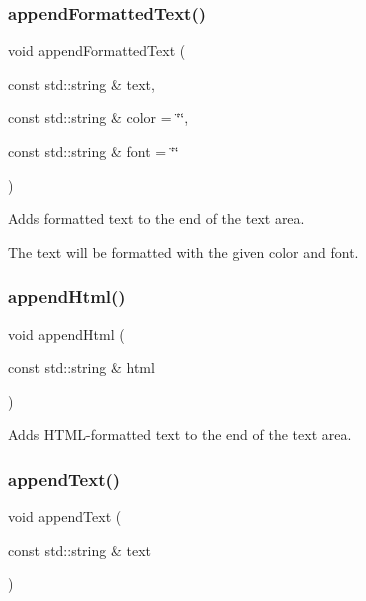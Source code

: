 \subsubsection{\texorpdfstring{append\+Formatted\+Text()}{appendFormattedText()}}
{\footnotesize\ttfamily void append\+Formatted\+Text (\begin{DoxyParamCaption}\item[{const std\+::string \&}]{text,  }\item[{const std\+::string \&}]{color = {\ttfamily \char`\"{}\char`\"{}},  }\item[{const std\+::string \&}]{font = {\ttfamily \char`\"{}\char`\"{}} }\end{DoxyParamCaption})\hspace{0.3cm}{\ttfamily [virtual]}}



Adds formatted text to the end of the text area. 

The text will be formatted with the given color and font. \mbox{\label{classsgl_1_1GTextArea_aa3457253e58dbfbf65a8f5a28c65fb5f}} 
\subsubsection{\texorpdfstring{append\+Html()}{appendHtml()}}
{\footnotesize\ttfamily void append\+Html (\begin{DoxyParamCaption}\item[{const std\+::string \&}]{html }\end{DoxyParamCaption})\hspace{0.3cm}{\ttfamily [virtual]}}



Adds H\+T\+M\+L-\/formatted text to the end of the text area. 

\mbox{\label{classsgl_1_1GTextArea_a6ba815b59563007b60dc2052d4703146}} 
\subsubsection{\texorpdfstring{append\+Text()}{appendText()}}
{\footnotesize\ttfamily void append\+Text (\begin{DoxyParamCaption}\item[{const std\+::string \&}]{text }\end{DoxyParamCaption})\hspace{0.3cm}{\ttfamily [virtual]}}



